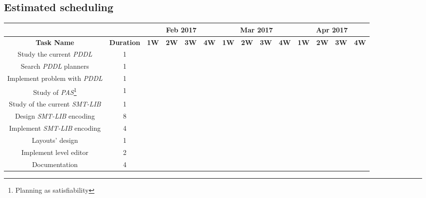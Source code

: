 \documentclass{report}
\theoremstyle{plain}
\begin{document}
\begin{landscape}


\section{Estimated scheduling}
\begin{tabular}{cc|c|c|c|c|c|c|c|c|c|c|c|c||}
    \cline{3-14}
    & & \multicolumn{4}{||c|}{\textbf{Feb 2017}} & \multicolumn{4}{c|}{\textbf{Mar 2017}} & \multicolumn{4}{c||}{\textbf{Apr 2017}} \\
    \hline
    \multicolumn{1}{||c|}{\textbf{Task Name}} & \multicolumn{1}{|c|}{\textbf{Duration}} & \textbf{1W} & \textbf{2W} & \textbf{3W} & \textbf{4W} & \textbf{1W} & \textbf{2W} & \textbf{3W} & \textbf{4W} & \textbf{1W} & \textbf{2W} & \textbf{3W} & \textbf{4W} \\
    \hline\hline
    \multicolumn{1}{||c|}{Study the current \emph{PDDL}} & 1 & \cellcolor{F} & & & & & & & & & & & \\
    \hline
    \multicolumn{1}{||c|}{Search \emph{PDDL} planners} & 1 & & \cellcolor{F} & & & & & & & & & & \\
    \hline 
    \multicolumn{1}{||c|}{Implement problem with \emph{PDDL}} & 1 & & & \cellcolor{F} & & & & & & & & & \\
    \hline 
    \multicolumn{1}{||c|}{Study of \emph{PAS}\footnote{Planning as satisfiability}} & 1 & & & & \cellcolor{F} & & & & & & & & \\
    \hline 
    \multicolumn{1}{||c|}{Study of the current \emph{SMT-LIB}} & 1 & & & & & \cellcolor{F} & & & & & & & \\
    \hline 
    \multicolumn{1}{||c|}{Design \emph{SMT-LIB} encoding} & 8 & & & & & & \cellcolor{F} & \cellcolor{F} & \cellcolor{F} & \cellcolor{F} & \cellcolor{F} & \cellcolor{F} & \cellcolor{F} \\
    \hline 
    \multicolumn{1}{||c|}{Implement \emph{SMT-LIB} encoding} & 4 & & & & & & & & & & & & \\
    \hline 
    \multicolumn{1}{||c|}{Layouts' design} & 1 & & & & & & & & & & & & \\
    \hline 
    \multicolumn{1}{||c|}{Implement level editor} & 2 & & & & & & & & & & & & \\
    \hline
    \multicolumn{1}{||c|}{Documentation} & 4 & & & & & & & & & & & & \\
    \hline 
\end{tabular}


\end{landscape}
\end{document}
